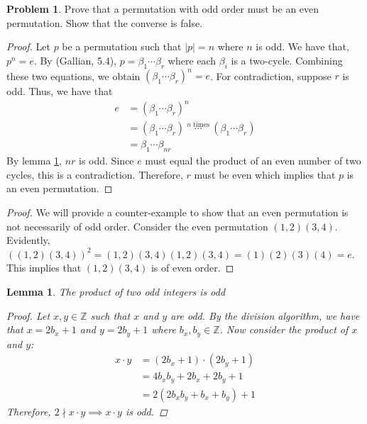 \documentclass[12pt,reqno]{article}
\newcommand{\Z}{\mathbb{Z}}
\theoremstyle{plain}
\newtheorem{lemma}{Lemma}
\theoremstyle{definition}
\newtheorem{problem}{Problem}
\begin{document}
\newpage


\begin{problem}  
    Prove that a permutation with odd order must be an even permutation. Show that the converse is false.
\end{problem}

\begin{proof}
    Let \(p\) be a permutation such that \(|p|=n\) where \(n\) is odd. We have that, \(p^n=e\).
    By (Gallian, 5.4), \(p=\beta_1\cdots\beta_r\) where each \(\beta_i\) is a two-cycle.
    Combining these two equations, we obtain \((\beta_1\cdots\beta_r)^n=e\). For contradiction,
    suppose \(r\) is odd. Thus, we have that
    \begin{align*}
        e &= (\beta_1\cdots\beta_r)^n\\
        &= (\beta_1\cdots\beta_r)\ \overset{n\text{ times}}{\cdots}\ (\beta_1\cdots\beta_r)\\
        &= \beta_1\cdots\beta_{nr}
    \end{align*}
    By lemma \ref{lem:oddmult}, \(nr\) is odd. Since \(e\) must equal the product of an even number of two cycles, this is a contradiction.
    Therefore, \(r\) must be even which implies that \(p\) is an even permutation.
\end{proof}
\bigskip
\begin{proof}
    We will provide a counter-example to show that an even permutation is not necessarily of odd order.
    Consider the even permutation \((1,2)(3,4)\). Evidently, \(((1,2)(3,4))^2=(1,2)(3,4)(1,2)(3,4)=(1)(2)(3)(4)=e\). This implies that
    \((1,2)(3,4)\) is of even order.
\end{proof}
\bigskip
\begin{lemma}
    \label{lem:oddmult}
    The product of two odd integers is odd
    \begin{proof}
        Let \(x,y\in\Z\) such that \(x\) and \(y\) are odd. By the division algorithm, we have that
        \(x=2b_x+1\) and \(y=2b_y+1\) where \(b_x,b_y\in\Z\). Now consider the product of \(x\) and \(y\):
        \begin{align*}
            x\cdot y &= (2b_x+1)\cdot (2b_y+1)\\
            &= 4b_xb_y+2b_x+2b_y+1\\
            &= 2(2b_xb_y+b_x+b_y)+1
        \end{align*}
        Therefore, \(2\nmid x\cdot y\implies x\cdot y\) is odd.
    \end{proof}
\end{lemma}
\end{document}
